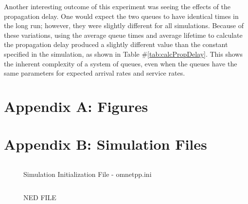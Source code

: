 \documentclass{article}
\begin{document}
Another interesting outcome of this experiment was seeing the effects of the propagation delay.  
One would expect the two queues to have identical times in the long run; however, they were slightly different for all simulations.
Because of these variations, using the average queue times and average lifetime to calculate the propagation delay produced a slightly different value than the constant specified in the simulation, as shown in Table \#\ref{tab:calcPropDelay}.
This shows the inherent complexity of a system of queues, even when the queues have the same parameters for expected arrival rates and service rates.


\newpage
\section*{Appendix A:  Figures}
\label{sec:Figures}



\newpage
\clearpage
\section*{Appendix B:  Simulation Files}
\label{sec:SimFiles}

\begin{figure}[h!]
\begin{lstlisting}

\end{lstlisting}
\vspace{-1cm}
\caption*{Simulation Initialization File - omnetpp.ini}
\end{figure}


\newpage
\begin{figure}[h!]
\begin{lstlisting}

\end{lstlisting}
\vspace{-1cm}
\caption*{NED FILE}
\end{figure}
\end{document}

